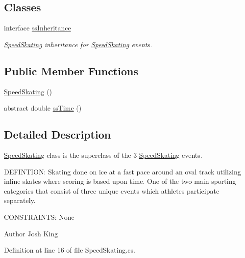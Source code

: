 \subsection*{Classes}
\begin{DoxyCompactItemize}
\item 
interface \hyperlink{interfacePCO_1_1SpeedSkating_1_1ssInheritance}{ss\+Inheritance}
\begin{DoxyCompactList}\small\item\em \hyperlink{classPCO_1_1SpeedSkating}{Speed\+Skating} inheritance for \hyperlink{classPCO_1_1SpeedSkating}{Speed\+Skating} events. \end{DoxyCompactList}\end{DoxyCompactItemize}
\subsection*{Public Member Functions}
\begin{DoxyCompactItemize}
\item 
\hyperlink{classPCO_1_1SpeedSkating_ae34dc14b71519b97d8eb3c59b6ec4dfe}{Speed\+Skating} ()
\item 
abstract double \hyperlink{classPCO_1_1SpeedSkating_a3bc4e4731f04b9ef3d260197ad847117}{ss\+Time} ()
\end{DoxyCompactItemize}


\subsection{Detailed Description}
\hyperlink{classPCO_1_1SpeedSkating}{Speed\+Skating} class is the superclass of the 3 \hyperlink{classPCO_1_1SpeedSkating}{Speed\+Skating} events. 

D\+E\+F\+I\+N\+T\+I\+O\+N\+: Skating done on ice at a fast pace around an oval track utilizing inline skates where scoring is based upon time. One of the two main sporting categories that consist of three unique events which athletes participate separately.

C\+O\+N\+S\+T\+R\+A\+I\+N\+T\+S\+: None\begin{DoxyAuthor}{Author}
Josh King 
\end{DoxyAuthor}


Definition at line 16 of file Speed\+Skating.\+cs.



